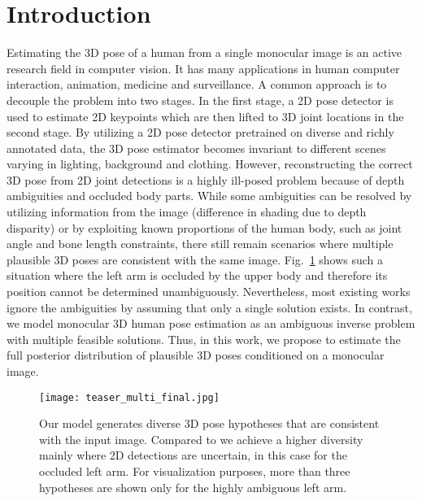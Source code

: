 \documentclass[10pt,twocolumn,letterpaper]{article}
\begin{document}
\section{Introduction}
Estimating the 3D pose of a human from a single monocular image is an active research field in computer vision.
It has many applications \eg in human computer interaction, animation, medicine and surveillance. 
A common approach is to decouple the problem into two stages. 
In the first stage, a 2D pose detector is used to estimate 2D keypoints which are then lifted to 3D joint locations in the second stage.
By utilizing a 2D pose detector pretrained on diverse and richly annotated data,
the 3D pose estimator becomes invariant to different scenes varying in lighting, background and clothing.
However, reconstructing the correct 3D pose from 2D joint detections is a highly ill-posed problem because of depth ambiguities and occluded body parts.
While some ambiguities can be resolved by utilizing information from the image (\eg difference in shading due to depth disparity) or by exploiting known proportions of the human body, such as joint angle and bone length constraints, there still remain scenarios where multiple plausible 3D poses are consistent with the same image.
Fig.~\ref{fig:teaser} shows such a situation where the left arm is occluded by the upper body and therefore its position cannot be determined unambiguously.
Nevertheless, most existing works ignore the ambiguities by assuming
that only a single solution exists.
In contrast, we model monocular 3D human pose estimation as an ambiguous inverse problem with multiple feasible solutions.
Thus, in this work, we propose to estimate the full posterior distribution of plausible 3D poses conditioned on a monocular image.
\begin{figure}
\begin{center}
\texttt{[image: teaser\_multi\_final.jpg]}
\caption{Our model generates diverse 3D pose hypotheses that are consistent with the input image.
Compared to \cite{Li_2019_CVPR,Sharma_2019_ICCV} we achieve a higher diversity mainly where 2D detections are uncertain, in this case for the occluded left arm.
For visualization purposes, more than three hypotheses are shown only for the highly ambiguous left arm.}
\vspace{-1.5em}
\label{fig:teaser}
\end{center}
\end{figure}
\end{document}
